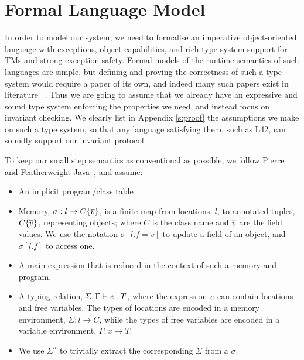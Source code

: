 \section{Formal Language Model}
\label{s:formalism}

In order to model our system, we need to formalise an imperative object-oriented language
with exceptions, object capabilities, and rich type system
support for TMs and strong exception safety.
Formal models of the runtime semantics of such languages are simple, but 
defining and proving the correctness of such a type system would require a paper
of its own, and indeed many such papers exist in literature%
~\cite{ServettoEtAl13a,ServettoZucca15,GordonEtAl12,clebsch2015deny,JOT:issue_2011_01/article1}.
Thus we are going to assume that we already have an expressive and sound type system enforcing the properties we need, and instead focus on invariant checking.
We clearly list in Appendix \ref{s:proof} the assumptions we make on such a type system, so that any language satisfying them, such as L42, can soundly support our invariant protocol.

To keep our small step semantics as conventional as possible, we follow Pierce~\cite{pierce2002types} and Featherweight Java~\cite{IgarashiEtAl01}, and assume:
\begin{itemize}
	\item An implicit program/class table
	\item Memory, $\sigma : l\rightarrow C\{\hspace{0.03ex} \overline{\hspace{-0.03ex}v\hspace{-0.03ex}} \hspace{0.03ex}\}${, is} a finite map from locations, $l$, to annotated tuples, $C\{\hspace{0.03ex} \overline{\hspace{-0.03ex}v\hspace{-0.03ex}} \hspace{0.03ex}\}$, representing objects; where $C$ is the class name and $\hspace{0.03ex} \overline{\hspace{-0.03ex}v\hspace{-0.03ex}} \hspace{0.03ex}$ are the field values.
	We use the notation $\sigma[l.f=v]$ to update a field of an object, and $\sigma[l.f]$ to access one.
	\item A main expression that is reduced in the context of such a memory and program.
	\item A typing relation, $\Sigma;\Gamma\vdash{\ensuremath{\mathit{e}}}:T$, where 
	the expression ${\mathit{e}}$ can contain locations and free variables. The types of locations are encoded in 
a memory environment, 
$\Sigma : l\rightarrow C$,
	while the types of free variables are encoded in
a variable environment, $\Gamma : x\rightarrow T$.
	\item We use $\Sigma^\sigma$ to trivially extract the corresponding $\Sigma$ from a $\sigma$.
\end{itemize}

